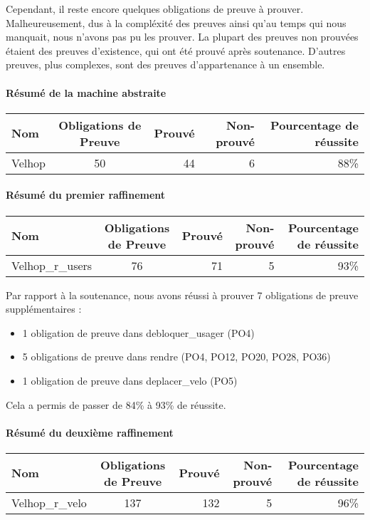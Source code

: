 \documentclass[12pt]{article}
\begin{document}
Cependant, il reste encore quelques obligations de preuve à prouver. Malheureusement, dus à la compléxité des preuves ainsi qu'au temps qui nous manquait, nous n'avons pas pu les prouver. La plupart des preuves non prouvées étaient des preuves d'existence, qui ont été prouvé après soutenance. D'autres preuves, plus complexes, sont des preuves d'appartenance à un ensemble.
\paragraph{Résumé de la machine abstraite}
\begin{center}
	\begin{tabular}{| l | c | r | r| r |}
		\hline
		Nom & Obligations de Preuve & Prouvé & Non-prouvé & Pourcentage de réussite \\ \hline
		Velhop & 50 & 44 & 6 & 88\% \\ \hline
	\end{tabular}
\end{center}

\paragraph{Résumé du premier raffinement}
\begin{center}
	\begin{tabular}{| l | c | r | r|r|}
		\hline
    Nom & Obligations de Preuve & Prouvé & Non-prouvé & Pourcentage de réussite\\ \hline
    Velhop\_r\_users & 76 & 71 & 5 & 93\% \\ \hline
	\end{tabular}
\end{center}

Par rapport à la soutenance, nous avons réussi à prouver 7 obligations de preuve supplémentaires : 
\begin{itemize}
  \item 1 obligation de preuve dans debloquer\_usager (PO4)
  \item 5 obligations de preuve dans rendre (PO4, PO12, PO20, PO28, PO36)
  \item 1 obligation de preuve dans deplacer\_velo (PO5)
\end{itemize}

Cela a permis de passer de 84\% à 93\% de réussite.

\paragraph{Résumé du deuxième raffinement}
\begin{center}
	\begin{tabular}{| l | c | r | r|r|}
		\hline
		Nom & Obligations de Preuve & Prouvé & Non-prouvé & Pourcentage de réussite\\ \hline
    Velhop\_r\_velo & 137 & 132 & 5 & 96\% \\ \hline
	\end{tabular}
\end{center}
\end{document}

